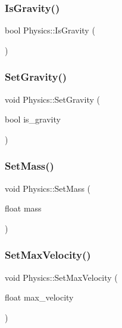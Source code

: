 \subsubsection{\texorpdfstring{Is\+Gravity()}{IsGravity()}}
{\footnotesize\ttfamily bool Physics\+::\+Is\+Gravity (\begin{DoxyParamCaption}{ }\end{DoxyParamCaption})\hspace{0.3cm}{\ttfamily [inline]}}

\mbox{\label{class_physics_a6f4c3f73eb1d2669ccc449b0d74f9d32}} 
\subsubsection{\texorpdfstring{Set\+Gravity()}{SetGravity()}}
{\footnotesize\ttfamily void Physics\+::\+Set\+Gravity (\begin{DoxyParamCaption}\item[{bool}]{is\+\_\+gravity }\end{DoxyParamCaption})\hspace{0.3cm}{\ttfamily [inline]}}

\mbox{\label{class_physics_a7a6eac8c5f6d7db0baef290710825085}} 
\subsubsection{\texorpdfstring{Set\+Mass()}{SetMass()}}
{\footnotesize\ttfamily void Physics\+::\+Set\+Mass (\begin{DoxyParamCaption}\item[{float}]{mass }\end{DoxyParamCaption})\hspace{0.3cm}{\ttfamily [inline]}}

\mbox{\label{class_physics_afd9e36bb94e921a41818f261df4205d0}} 
\subsubsection{\texorpdfstring{Set\+Max\+Velocity()}{SetMaxVelocity()}}
{\footnotesize\ttfamily void Physics\+::\+Set\+Max\+Velocity (\begin{DoxyParamCaption}\item[{float}]{max\+\_\+velocity }\end{DoxyParamCaption})\hspace{0.3cm}{\ttfamily [inline]}}

